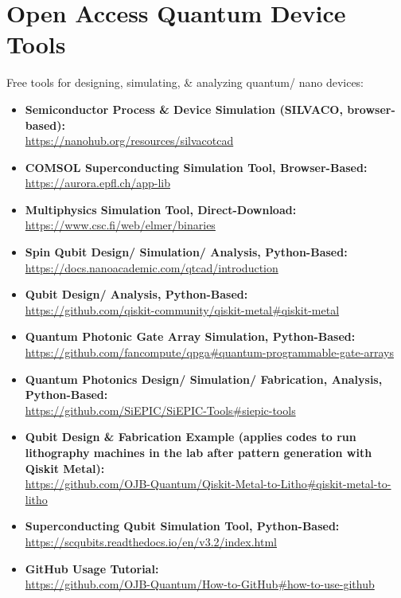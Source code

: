 \chapter{\LARGE{Open Access Quantum Device Tools}}

\begin{flushleft}
\large Free tools for designing, simulating, \& analyzing quantum/ nano devices:
\end{flushleft}

\normalsize\begin{itemize}

  \item\textbf{Semiconductor Process \& Device Simulation (SILVACO, browser-based):}\\
\url{https://nanohub.org/resources/silvacotcad}
  \item\textbf{COMSOL Superconducting Simulation Tool, Browser-Based:}\\
\url{https://aurora.epfl.ch/app-lib}
  \item\textbf{Multiphysics Simulation Tool, Direct-Download:}\\
\url{https://www.csc.fi/web/elmer/binaries}
  \item\textbf{Spin Qubit Design/ Simulation/ Analysis, Python-Based:}\\
\url{https://docs.nanoacademic.com/qtcad/introduction}
  \item\textbf{Qubit Design/ Analysis, Python-Based:}\\
\url{https://github.com/qiskit-community/qiskit-metal#qiskit-metal}
  \item\textbf{Quantum Photonic Gate Array Simulation, Python-Based:}\\
\url{https://github.com/fancompute/qpga#quantum-programmable-gate-arrays}
  \item\textbf{Quantum Photonics Design/ Simulation/ Fabrication, Analysis, Python-Based:}\\
\url{https://github.com/SiEPIC/SiEPIC-Tools#siepic-tools}
  \item\textbf{Qubit Design \& Fabrication Example (applies codes to run lithography machines in the lab after pattern generation with Qiskit Metal):}\\
\url{https://github.com/OJB-Quantum/Qiskit-Metal-to-Litho#qiskit-metal-to-litho}
  \item\textbf{Superconducting Qubit Simulation Tool, Python-Based:}\\
\url{https://scqubits.readthedocs.io/en/v3.2/index.html}
  \item\textbf{GitHub Usage Tutorial:}\\
\url{https://github.com/OJB-Quantum/How-to-GitHub#how-to-use-github}\\

\end{itemize}
